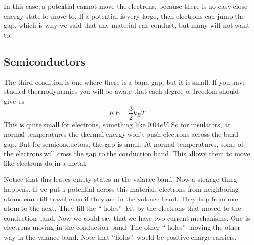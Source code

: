 In this case, a potential cannot
move the electrons, because there is no easy close energy state to move to.
If a potential is very large, then electrons can jump the gap, which is why
we said that any material can conduct, but many will not want to.

\subsection{Semiconductors}

The third condition is one where there is a band gap, but it is small. 
If you have studied
thermodynamics you will be aware that each degree of freedom should give us 
\begin{equation*}
	KE=\frac{3}{2}k_{B}T
\end{equation*}%
This is quite small for electrons, something like $0.04\unit{eV}.$ So for
insulators, at normal temperatures the thermal energy won't push electrons
across the band gap. But for semiconductors, the gap is small. At normal
temperatures, some of the electrons will cross the gap to the conduction
band. This allows them to move like electrons do in a metal. 

Notice that this leaves empty states in the valance band. Now a strange
thing happens. If we put a potential across this material, electrons from
neighboring atoms can still travel even if they are in the valance band.
They hop from one atom to the next. They fill the \textquotedblleft
holes\textquotedblright\ left by the electrons that moved to the conduction
band. Now we could say that we have two current mechanisms. One is electrons
moving in the conduction band. The other \textquotedblleft
holes\textquotedblright\ moving the other way in the valance band. Note that
\textquotedblleft holes\textquotedblright\ would be positive charge carriers.

